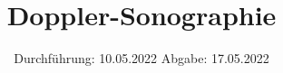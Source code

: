 

\subject{VERSUCH US3}
\title{Doppler-Sonographie}
\date{%
  Durchführung: 10.05.2022
  \hspace{3em}
  Abgabe: 17.05.2022
}



\maketitle
\thispagestyle{empty}
\tableofcontents
\newpage







\printbibliography{}


